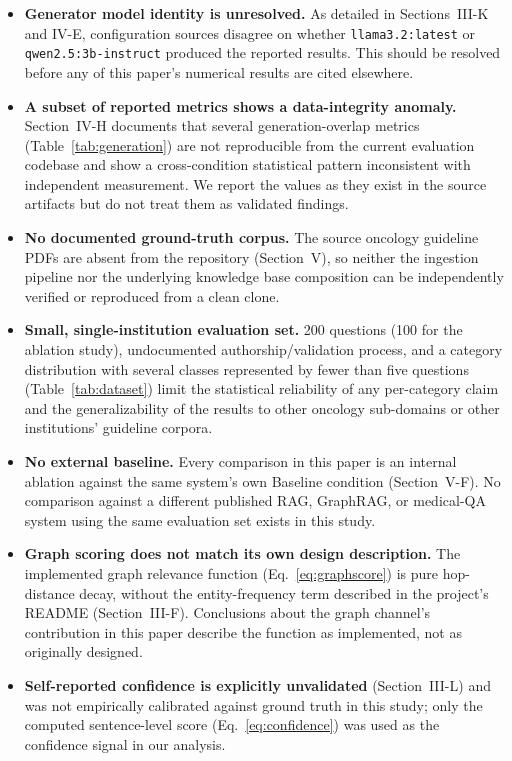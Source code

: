 \documentclass[conference]{IEEEtran}
\begin{document}
\begin{itemize}
    \item \textbf{Generator model identity is unresolved.} As detailed in Sections~III-K and IV-E, configuration sources disagree on whether \texttt{llama3.2:latest} or \texttt{qwen2.5:3b-instruct} produced the reported results. This should be resolved before any of this paper's numerical results are cited elsewhere.
    \item \textbf{A subset of reported metrics shows a data-integrity anomaly.} Section~IV-H documents that several generation-overlap metrics (Table~\ref{tab:generation}) are not reproducible from the current evaluation codebase and show a cross-condition statistical pattern inconsistent with independent measurement. We report the values as they exist in the source artifacts but do not treat them as validated findings.
    \item \textbf{No documented ground-truth corpus.} The source oncology guideline PDFs are absent from the repository (Section~V), so neither the ingestion pipeline nor the underlying knowledge base composition can be independently verified or reproduced from a clean clone.
    \item \textbf{Small, single-institution evaluation set.} 200 questions (100 for the ablation study), undocumented authorship/validation process, and a category distribution with several classes represented by fewer than five questions (Table~\ref{tab:dataset}) limit the statistical reliability of any per-category claim and the generalizability of the results to other oncology sub-domains or other institutions' guideline corpora.
    \item \textbf{No external baseline.} Every comparison in this paper is an internal ablation against the same system's own Baseline condition (Section~V-F). No comparison against a different published RAG, GraphRAG, or medical-QA system using the same evaluation set exists in this study.
    \item \textbf{Graph scoring does not match its own design description.} The implemented graph relevance function (Eq.~\ref{eq:graphscore}) is pure hop-distance decay, without the entity-frequency term described in the project's README (Section~III-F). Conclusions about the graph channel's contribution in this paper describe the function as implemented, not as originally designed.
    \item \textbf{Self-reported confidence is explicitly unvalidated} (Section~III-L) and was not empirically calibrated against ground truth in this study; only the computed sentence-level score (Eq.~\ref{eq:confidence}) was used as the confidence signal in our analysis.

\end{itemize}
\end{document}
